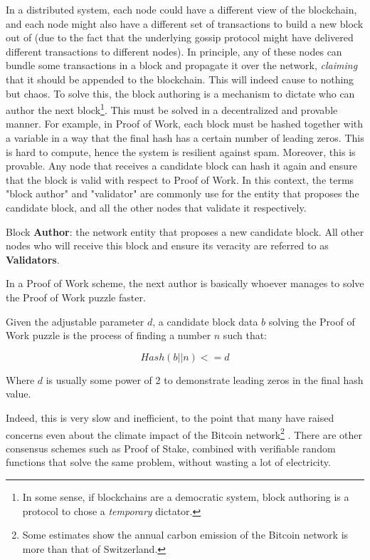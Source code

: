 In a distributed system, each node could have a different view of the blockchain, and each node
might also have a different set of transactions to build a new block out of (due to the fact that
the underlying gossip protocol might have delivered different transactions to different nodes). In
principle, any of these nodes can bundle some transactions in a block and propagate it over the
network, \textit{claiming} that it should be appended to the blockchain. This will indeed cause to
nothing but chaos. To solve this, the block authoring is a mechanism to dictate who can author the
next block\footnote{In some sense, if blockchains are a democratic system, block authoring is a
protocol to chose a \textit{temporary} dictator.}. This must be solved in a decentralized and
provable manner. For example, in Proof of Work, each block must be hashed together with a variable
in a way that the final hash has a certain number of leading zeros. This is hard to compute, hence
the system is resilient against spam. Moreover, this is provable. Any node that receives a candidate
block can hash it again and ensure that the block is valid with respect to Proof of Work. In this
context, the terms "block author" and "validator" are commonly use for the entity that proposes the
candidate block, and all the other nodes that validate it respectively.

\begin{definition} \label{def:auhtor_validator}
	Block \textbf{Author}: the network entity that proposes a new candidate block. All other nodes
	who will receive this block and ensure its veracity are referred to as \textbf{Validators}.
\end{definition}

In a Proof of Work scheme, the next author is basically whoever manages to solve the Proof of Work
puzzle faster.

\begin{definition} \label{def:pow}
	Given the adjustable parameter $d$, a candidate block data $b$ solving the Proof of Work puzzle
	is the process of finding a number $n$ such that:

	\begin{equation}
		Hash(b || n) <= d
	\end{equation}

Where $d$ is usually some power of 2 to demonstrate leading zeros in the final hash value.
\end{definition}


Indeed, this is very slow and inefficient, to the point that many have raised concerns even about
the climate impact of the Bitcoin network\footnote{Some estimates show the annual carbon emission of
the Bitcoin network is more than that of Switzerland.} \cite{btc_carbon}. There are other consensus
schemes such as Proof of Stake, combined with verifiable random functions that solve the same
problem, without wasting a lot of electricity.

